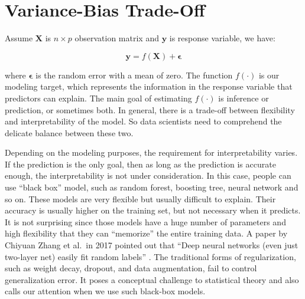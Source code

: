 \documentclass[
  12pt,
]{krantz}
\begin{document}
\hypertarget{vbtradeoff}{%
\section{Variance-Bias Trade-Off}\label{vbtradeoff}}

Assume \(\mathbf{X}\) is \(n \times p\) observation matrix and \(\mathbf{y}\) is response variable, we have:

\begin{equation}
\mathbf{y}=f(\mathbf{X})+\symbf{\epsilon}
\label{eq:generalmodeleq}
\end{equation}

where \(\symbf{\epsilon}\) is the random error with a mean of zero. The function \(f(\cdot)\) is our modeling target, which represents the information in the response variable that predictors can explain. The main goal of estimating \(f(\cdot)\) is inference or prediction, or sometimes both. In general, there is a trade-off between flexibility and interpretability of the model. So data scientists need to comprehend the delicate balance between these two.

Depending on the modeling purposes, the requirement for interpretability varies. If the prediction is the only goal, then as long as the prediction is accurate enough, the interpretability is not under consideration. In this case, people can use ``black box'' model, such as random forest, boosting tree, neural network and so on. These models are very flexible but usually difficult to explain. Their accuracy is usually higher on the training set, but not necessary when it predicts. It is not surprising since those models have a huge number of parameters and high flexibility that they can ``memorize'' the entire training data. A paper by Chiyuan Zhang et al.~in 2017 pointed out that ``Deep neural networks (even just two-layer net) easily fit random labels'' \citep{rethinkDL}. The traditional forms of regularization, such as weight decay, dropout, and data augmentation, fail to control generalization error. It poses a conceptual challenge to statistical theory and also calls our attention when we use such black-box models.
\end{document}
